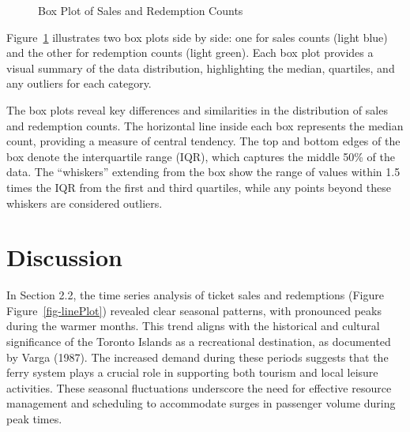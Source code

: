 \documentclass[
  letterpaper,
  DIV=11,
  numbers=noendperiod]{scrartcl}
\begin{document}
\begin{figure}


\caption{\label{fig-boxPlot}Box Plot of Sales and Redemption Counts}

\end{figure}%

Figure~\ref{fig-boxPlot} illustrates two box plots side by side: one for
sales counts (light blue) and the other for redemption counts (light
green). Each box plot provides a visual summary of the data
distribution, highlighting the median, quartiles, and any outliers for
each category.

The box plots reveal key differences and similarities in the
distribution of sales and redemption counts. The horizontal line inside
each box represents the median count, providing a measure of central
tendency. The top and bottom edges of the box denote the interquartile
range (IQR), which captures the middle 50\% of the data. The
``whiskers'' extending from the box show the range of values within 1.5
times the IQR from the first and third quartiles, while any points
beyond these whiskers are considered outliers.

\section{Discussion}\label{sec-discussion}

In Section 2.2, the time series analysis of ticket sales and redemptions
(Figure Figure~\ref{fig-linePlot}) revealed clear seasonal patterns,
with pronounced peaks during the warmer months. This trend aligns with
the historical and cultural significance of the Toronto Islands as a
recreational destination, as documented by Varga (1987). The increased
demand during these periods suggests that the ferry system plays a
crucial role in supporting both tourism and local leisure activities.
These seasonal fluctuations underscore the need for effective resource
management and scheduling to accommodate surges in passenger volume
during peak times.
\end{document}
